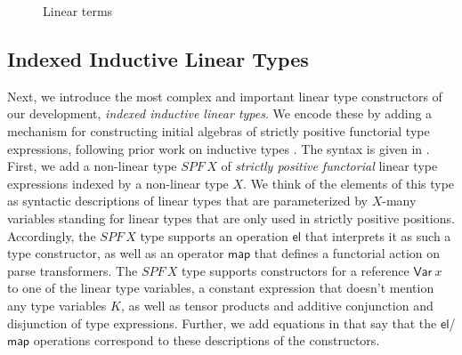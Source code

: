 \documentclass[acmsmall,nonacm]{acmart}
\renewcommand{\Gamma}{\mathgtt{G}}
\renewcommand{\Delta}{\mathgtt{D}}
\newcommand{\SPF}{SPF}
\newcommand{\Var}{\mathsf{Var}}
\newcommand{\map}{\mathsf{map}}
\newcommand{\el}{\mathsf{el}}
\newcommand{\letin}[3]{\mathsf{let}\, #1 = #2 \, \mathsf{in}\, #3}
\newcommand{\applto}[2]{#1 \, #2}
\newcommand{\equalizer}[3]{\{#1\,|\,\applto {#2}{#1} = \applto{#3}{#1} \}}
\newcommand{\equalizerin}[1]{\langle #1 \rangle}
\newcommand{\equalizerpi}[1]{#1.\pi}
\begin{document}
\begin{figure}
  \caption{Linear terms}
  \label{fig:linear-terms}
\end{figure}

\subsection{Indexed Inductive Linear Types}

Next, we introduce the most complex and important linear type
constructors of our development, \emph{indexed inductive linear
types}. We encode these by adding a mechanism for constructing initial
algebras of strictly positive functorial type expressions, following
prior work on inductive types
\cite{nakov_quantitative_2022,altenkirch_indexed_2015}. The syntax is
given in . First, we add a non-linear type $\SPF\,X$ of
\emph{strictly positive functorial} linear type expressions indexed by
a non-linear type $X$. We think of the elements of this type as
syntactic descriptions of linear types that are parameterized by
$X$-many variables standing for linear types that are only used in
strictly positive positions. Accordingly, the $\SPF\,X$ type supports
an operation $\el$ that interprets it as such a type constructor, as
well as an operator $\map$ that defines a functorial action on parse
transformers. The $\SPF\,X$ type supports constructors for a reference
$\Var~x$ to one of the linear type variables, a constant expression
that doesn't mention any type variables $K$, as well as tensor
products and additive conjunction and disjunction of type expressions.
Further, we add equations in \fi that say that the
$\el$/$\map$ operations correspond to these descriptions of the
constructors.
\end{document}

